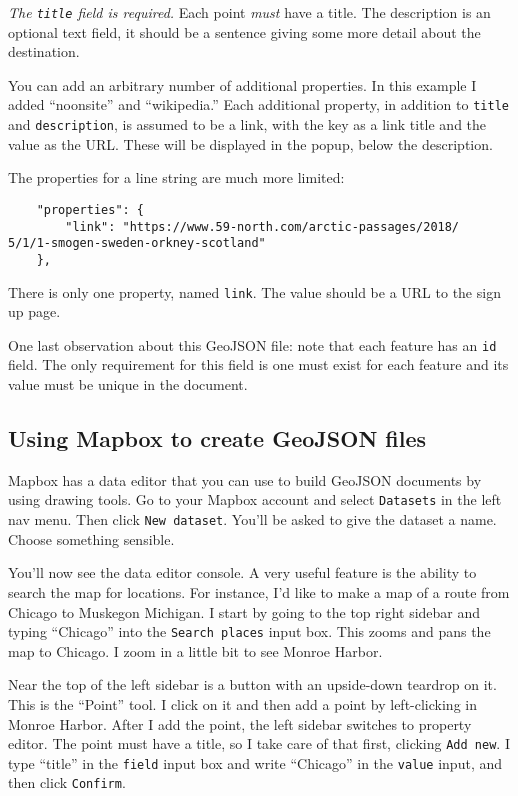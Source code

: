 \documentclass[11pt]{article}
\begin{document}
\emph{The \texttt{title} field is required.} Each point \emph{must}
have a title. The description is an optional text field, it should be
a sentence giving some more detail about the destination.

You can add an arbitrary number of additional properties. In this
example I added ``noonsite'' and ``wikipedia.'' Each additional
property, in addition to \texttt{title} and \texttt{description}, is
assumed to be a link, with the key as a link title and the value as
the URL. These will be displayed in the popup, below the description.

The properties for a line string are much more limited:

\begin{verbatim}
    "properties": {
        "link": "https://www.59-north.com/arctic-passages/2018/
5/1/1-smogen-sweden-orkney-scotland"
    },
\end{verbatim}

There is only one property, named \texttt{link}. The value should be a
URL to the sign up page.

One last observation about this GeoJSON file: note that each feature
has an \texttt{id} field. The only requirement for this field is one
must exist for each feature and its value must be unique in the
document.

\subsection{Using Mapbox to create GeoJSON files}

\label{geojson}

Mapbox has a data editor that you can use to build GeoJSON documents
by using drawing tools. Go to your Mapbox account and select
\texttt{Datasets} in the left nav menu. Then click \texttt{New
  dataset}. You'll be asked to give the dataset a name. Choose
something sensible.

You'll now see the data editor console. A very useful feature is the
ability to search the map for locations. For instance, I'd like to
make a map of a route from Chicago to Muskegon Michigan. I start by
going to the top right sidebar and typing ``Chicago'' into the
\texttt{Search places} input box. This zooms and pans the map to
Chicago. I zoom in a little bit to see Monroe Harbor.

Near the top of the left sidebar is a button with an upside-down
teardrop on it. This is the ``Point'' tool. I click on it and then add
a point by left-clicking in Monroe Harbor. After I add the point, the
left sidebar switches to property editor. The point must have a title,
so I take care of that first, clicking \texttt{Add new}. I type
``title'' in the \texttt{field} input box and write ``Chicago'' in the
\texttt{value} input, and then click \texttt{Confirm}.
\end{document}
